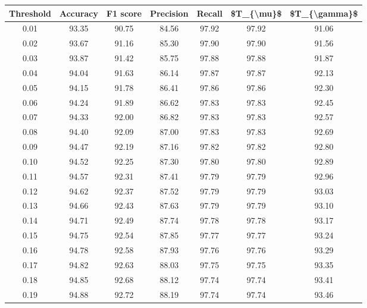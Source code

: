 \begin{tabular}{|c|c|c|c|c|c|c|}
\hline
 Threshold &  Accuracy &  F1 score &  Precision &  Recall &  \$T\_\{\textbackslash mu\}\$ &  \$T\_\{\textbackslash gamma\}\$ \\
\hline
      0.01 &     93.35 &     90.75 &      84.56 &   97.92 &      97.92 &         91.06 \\
      0.02 &     93.67 &     91.16 &      85.30 &   97.90 &      97.90 &         91.56 \\
      0.03 &     93.87 &     91.42 &      85.75 &   97.88 &      97.88 &         91.87 \\
      0.04 &     94.04 &     91.63 &      86.14 &   97.87 &      97.87 &         92.13 \\
      0.05 &     94.15 &     91.78 &      86.41 &   97.86 &      97.86 &         92.30 \\
      0.06 &     94.24 &     91.89 &      86.62 &   97.83 &      97.83 &         92.45 \\
      0.07 &     94.33 &     92.00 &      86.82 &   97.83 &      97.83 &         92.57 \\
      0.08 &     94.40 &     92.09 &      87.00 &   97.83 &      97.83 &         92.69 \\
      0.09 &     94.47 &     92.19 &      87.16 &   97.82 &      97.82 &         92.80 \\
      0.10 &     94.52 &     92.25 &      87.30 &   97.80 &      97.80 &         92.89 \\
      0.11 &     94.57 &     92.31 &      87.41 &   97.79 &      97.79 &         92.96 \\
      0.12 &     94.62 &     92.37 &      87.52 &   97.79 &      97.79 &         93.03 \\
      0.13 &     94.66 &     92.43 &      87.63 &   97.79 &      97.79 &         93.10 \\
      0.14 &     94.71 &     92.49 &      87.74 &   97.78 &      97.78 &         93.17 \\
      0.15 &     94.75 &     92.54 &      87.85 &   97.77 &      97.77 &         93.24 \\
      0.16 &     94.78 &     92.58 &      87.93 &   97.76 &      97.76 &         93.29 \\
      0.17 &     94.82 &     92.63 &      88.03 &   97.75 &      97.75 &         93.35 \\
      0.18 &     94.85 &     92.68 &      88.12 &   97.74 &      97.74 &         93.41 \\
      0.19 &     94.88 &     92.72 &      88.19 &   97.74 &      97.74 &         93.46 \\

\end{tabular}
